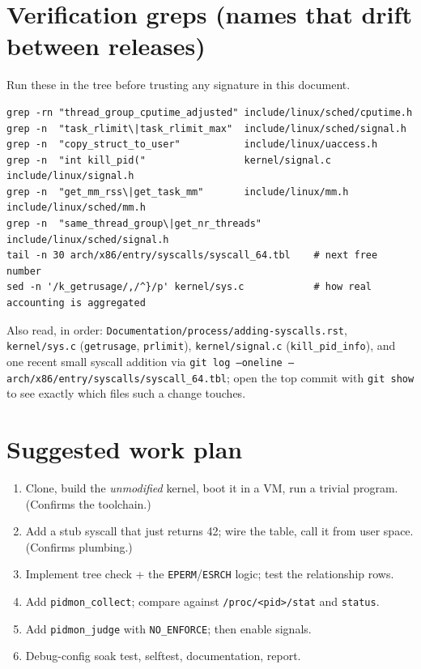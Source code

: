 \documentclass[11pt,a4paper]{article}
\newcommand{\kfile}[1]{\texttt{\small #1}}
\begin{document}
\section{Verification greps (names that drift between releases)}\label{sec:verify}
Run these in the tree before trusting any signature in this document.
\begin{lstlisting}[style=sh]
grep -rn "thread_group_cputime_adjusted" include/linux/sched/cputime.h
grep -n  "task_rlimit\|task_rlimit_max"  include/linux/sched/signal.h
grep -n  "copy_struct_to_user"           include/linux/uaccess.h
grep -n  "int kill_pid("                 kernel/signal.c include/linux/signal.h
grep -n  "get_mm_rss\|get_task_mm"       include/linux/mm.h include/linux/sched/mm.h
grep -n  "same_thread_group\|get_nr_threads" include/linux/sched/signal.h
tail -n 30 arch/x86/entry/syscalls/syscall_64.tbl    # next free number
sed -n '/k_getrusage/,/^}/p' kernel/sys.c            # how real accounting is aggregated
\end{lstlisting}
Also read, in order: \kfile{Documentation/process/adding-syscalls.rst}, \kfile{kernel/sys.c} (\texttt{getrusage}, \texttt{prlimit}), \kfile{kernel/signal.c} (\texttt{kill\_pid\_info}), and one recent small syscall addition via \texttt{git log --oneline -- arch/x86/entry/syscalls/syscall\_64.tbl}; open the top commit with \texttt{git show} to see exactly which files such a change touches.

\section{Suggested work plan}
\begin{enumerate}
  \item Clone, build the \emph{unmodified} kernel, boot it in a VM, run a trivial program. (Confirms the toolchain.)
  \item Add a stub syscall that just returns 42; wire the table, call it from user space. (Confirms plumbing.)
  \item Implement tree check + the \texttt{EPERM}/\texttt{ESRCH} logic; test the relationship rows.
  \item Add \texttt{pidmon\_collect}; compare against \texttt{/proc/<pid>/stat} and \texttt{status}.
  \item Add \texttt{pidmon\_judge} with \texttt{NO\_ENFORCE}; then enable signals.
  \item Debug-config soak test, selftest, documentation, report.
\end{enumerate}
\end{document}
